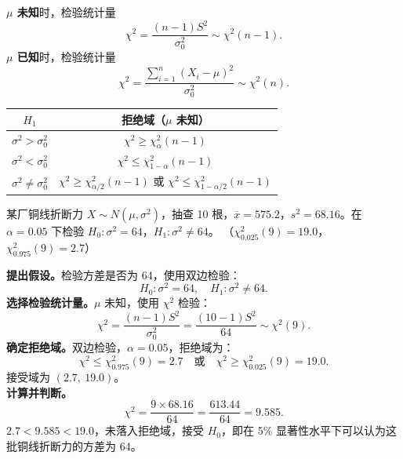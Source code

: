 \documentclass[lang=cn,11pt]{elegantbook}
\begin{document}
\begin{property}[$\chi^2$ 检验]\label{prop:chi2-test}
\textbf{\(\mu\) 未知}时，检验统计量
\[
\chi^2 = \frac{(n-1)S^2}{\sigma_0^2} \sim \chi^2(n-1).
\]
\textbf{\(\mu\) 已知}时，检验统计量
\[
\chi^2 = \frac{\sum_{i=1}^{n}(X_i-\mu)^2}{\sigma_0^2} \sim \chi^2(n).
\]
\begin{center}
\begin{tabular}{cc}
\toprule
\(H_1\) & 拒绝域（\(\mu\) 未知） \\
\midrule
\(\sigma^2 > \sigma_0^2\) & \(\chi^2 \geq \chi^2_\alpha(n-1)\) \\[4pt]
\(\sigma^2 < \sigma_0^2\) & \(\chi^2 \leq \chi^2_{1-\alpha}(n-1)\) \\[4pt]
\(\sigma^2 \neq \sigma_0^2\) & \(\chi^2 \geq \chi^2_{\alpha/2}(n-1)\) 或 \(\chi^2 \leq \chi^2_{1-\alpha/2}(n-1)\) \\
\bottomrule
\end{tabular}
\end{center}
\end{property}

\begin{exercise}\label{exer:9-chi2-two}
某厂铜线折断力 \(X \sim N(\mu, \sigma^2)\)，抽查 10 根，\(\overline{x}=575.2\)，\(s^2=68.16\)。在 \(\alpha=0.05\) 下检验 \(H_0\colon \sigma^2=64\)，\(H_1\colon \sigma^2\neq64\)。
（\(\chi^2_{0.025}(9)=19.0\)，\(\chi^2_{0.975}(9)=2.7\)）
\end{exercise}
\begin{solution}
\textbf{提出假设。}检验方差是否为 64，使用双边检验：
\[
H_0\colon \sigma^2 = 64,\quad H_1\colon \sigma^2 \neq 64.
\]
\textbf{选择检验统计量。}\(\mu\) 未知，使用 \(\chi^2\) 检验：
\[
\chi^2 = \frac{(n-1)S^2}{\sigma_0^2} = \frac{(10-1)S^2}{64} \sim \chi^2(9).
\]
\textbf{确定拒绝域。}双边检验，\(\alpha=0.05\)，拒绝域为：
\[
\chi^2 \leq \chi^2_{0.975}(9) = 2.7 \quad\text{或}\quad \chi^2 \geq \chi^2_{0.025}(9) = 19.0.
\]
接受域为 \((2.7,\ 19.0)\)。\\
\textbf{计算并判断。}
\[
\chi^2 = \frac{9 \times 68.16}{64} = \frac{613.44}{64} = 9.585.
\]
\(2.7 < 9.585 < 19.0\)，未落入拒绝域，接受 \(H_0\)，即在 5\% 显著性水平下可以认为这批铜线折断力的方差为 64。
\end{solution}
\end{document}
